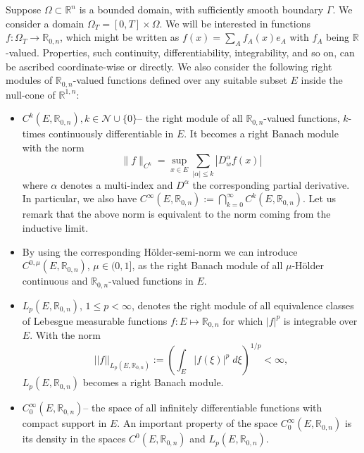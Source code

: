 \documentclass[12pt]{amsart}
\theoremstyle{definition}
\newcommand{\R}{\mathbb{R}}
\newcommand{\Cl}{\R_{0,n}}
\begin{document}
Suppose $\Omega\subset\mathbb{R}^{n}$ is a bounded domain, with sufficiently smooth boundary $\Gamma$. We consider a domain $\Omega_T=[0,T]\times\Omega$. We will be interested in functions $f:\Omega_T \rightarrow\R_{0,n}$, which might be written as $f(x)=\sum_{A}f_A(x)e_A$ with $f_A$ being $\R$-valued. Properties, such continuity, differentiability, integrability, and so on, can be ascribed coordinate-wise or directly. We also consider the following right modules of $\R_{0,n}$-valued functions defined over any suitable subset $E$ inside the null-cone of $\R^{1,n}$:
\begin{itemize}
	\item $C^k(E,\Cl), k\in\mathcal{N}\cup\{0\}$-- the right module of all $\Cl$-valued functions, $k$-times continuously differentiable in $E$. It becomes a right Banach module with the norm
	$$
	\|f\|_{C^k}=\sup_{x\in E}\sum_{|\alpha|\leq k}|D^\alpha_w f(x)|
	$$
where $\alpha$ denotes a multi-index and $D^\alpha$ the corresponding partial derivative. In particular, we also have $C^\infty(E,\Cl):=\bigcap_{k=0}^\infty C^k(E,\Cl)$. Let us remark that the above norm is equivalent to the norm coming from the inductive limit.

\item By using the corresponding H\"older-semi-norm we can introduce $C^{0,\mu}(E, \Cl)$, $\mu\in(0,1]$, as the right Banach module of all $\mu$-H\"older continuous and $\Cl$-valued functions in $E$. 
\item $L_p(E,\Cl)$, $1\leq p<\infty$, denotes the right module of all equivalence classes of Lebesgue measurable functions $f:E\mapsto\Cl$ for which $|f|^p$ is integrable over $E$.  With the norm
  \[||f||_{L_p(E,\Cl)}:=\left(\int_E |f(\xi)|^p\;d\xi\right)^{1/p}<\infty,
\]
$L_p(E,\Cl)$ becomes a right Banach module.
\item $C^\infty_0(E,\Cl)$-- the space of all infinitely differentiable functions with compact support in $E$. An important property of the space $C^\infty_0(E,\Cl)$ is its density in the spaces $C^0(E,\Cl)$ and $L_p(E,\Cl)$.
\end{itemize}
\end{document}
